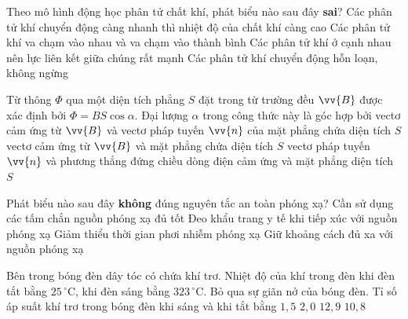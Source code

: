 	\begin{ex}%
		Theo mô hình động học phân tử chất khí, phát biểu nào sau đây \textbf{sai}?
		\choice
		{Các phân tử khí chuyển động càng nhanh thì nhiệt độ của chất khí càng cao}
		{Các phân tử khí va chạm vào nhau và va chạm vào thành bình}
		{\True Các phân tử khí ở cạnh nhau nên lực liên kết giữa chúng rất mạnh}
		{Các phân tử khí chuyển động hỗn loạn, không ngừng}
	\end{ex}

	\begin{ex}%
		Từ thông $\Phi$ qua một diện tích phẳng $S$ đặt trong từ trường đều $\vv{B}$ được xác định bởi $\Phi=BS\cos\alpha$. Đại lượng $\alpha$ trong công thức này là góc hợp bởi
		\choice
		{\True vectơ cảm ứng từ $\vv{B}$ và vectơ pháp tuyến $\vv{n}$ của mặt phẳng chứa diện tích $S$}
		{vectơ cảm ứng từ $\vv{B}$ và mặt phẳng chứa diện tích $S$}
		{vectơ pháp tuyến $\vv{n}$ và phương thẳng đứng}
		{chiều dòng điện cảm ứng và mặt phẳng diện tích $S$}
	\end{ex}

	\begin{ex}%
		Phát biểu nào sau đây \textbf{không} đúng nguyên tắc an toàn phóng xạ?
		\choice
		{Cần sử dụng các tấm chắn nguồn phóng xạ đủ tốt}
		{\True Đeo khẩu trang y tế khi tiếp xúc với nguồn phóng xạ}
		{Giảm thiểu thời gian phơi nhiễm phóng xạ}
		{Giữ khoảng cách đủ xa với nguồn phóng xạ}
	\end{ex}

	\begin{ex}%
		Bên trong bóng đèn dây tóc có chứa khí trơ. Nhiệt độ của khí trong đèn khi đèn tắt bằng $25\,^\circ\text{C}$, khi đèn sáng bằng $323\,^\circ\text{C}$. Bỏ qua sự giãn nở của bóng đèn. Tỉ số áp suất khí trơ trong bóng đèn khi sáng và khi tắt bằng
		\choice
		{$1{,}5$}
		{\True $2{,}0$}
		{$12{,}9$}
		{$10{,}8$}
	\end{ex}

